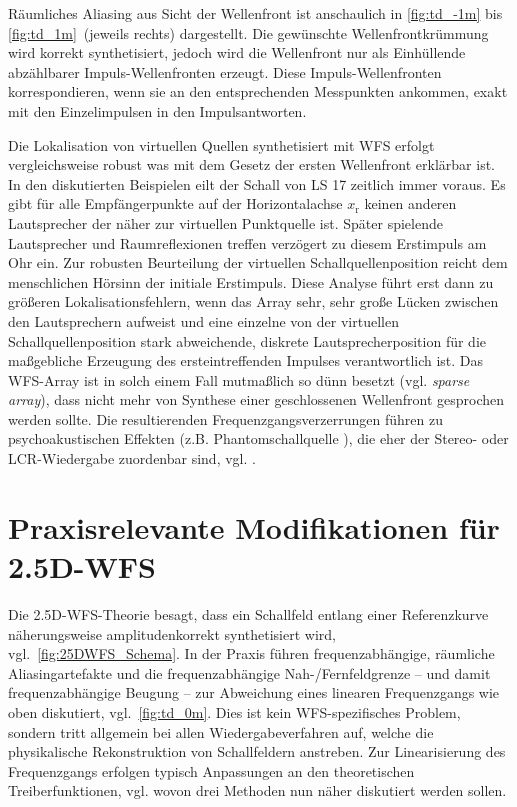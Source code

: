 Räumliches Aliasing aus Sicht der Wellenfront ist anschaulich
in \Abb\ref{fig:td_-1m} bis \ref{fig:td_1m}~(jeweils rechts)
dargestellt.
%
Die gewünschte Wellenfrontkrümmung wird korrekt synthetisiert, jedoch wird die
Wellenfront nur als Einhüllende abzählbarer Impuls-Wellenfronten erzeugt.
%
Diese Impuls-Wellenfronten korrespondieren, wenn sie an den entsprechenden
Messpunkten ankommen, exakt mit den Einzelimpulsen in den Impulsantworten.



Die Lokalisation von virtuellen Quellen synthetisiert mit WFS erfolgt
vergleichsweise robust \cite{Start1997_diss,Wittek2007_diss,Rohr2013_JAES,Wierstorf2014_diss,Erbes2020_diss}
was mit dem Gesetz der ersten Wellenfront \cite{Blauert1997_book} erklärbar ist.
%
In den diskutierten Beispielen eilt der Schall von LS 17 zeitlich immer voraus.
%
Es gibt für alle Empfängerpunkte auf der Horizontalachse $x_\mathrm{r}$
keinen anderen Lautsprecher der näher zur virtuellen Punktquelle ist.
%
Später spielende Lautsprecher und Raumreflexionen treffen
verzögert zu diesem Erstimpuls am Ohr ein.
%
Zur robusten Beurteilung der virtuellen Schallquellenposition reicht dem
menschlichen Hörsinn der initiale Erstimpuls.
%
Diese Analyse führt erst dann zu größeren Lokalisationsfehlern, wenn das Array
sehr, sehr große Lücken zwischen den Lautsprechern aufweist und eine einzelne
von der virtuellen Schallquellenposition stark abweichende, diskrete
Lautsprecherposition für die maßgebliche Erzeugung des ersteintreffenden Impulses
verantwortlich ist.
%
Das WFS-Array ist in solch einem Fall mutmaßlich so dünn besetzt (vgl.
\textit{sparse array}), dass nicht mehr von Synthese einer geschlossenen
Wellenfront gesprochen werden sollte.
%
Die resultierenden Frequenzgangsverzerrungen führen zu
psychoakustischen Effekten
(z.B. Phantomschallquelle \cite{Blauert1997_book}), die
eher der Stereo- oder LCR-Wiedergabe zuordenbar sind,
vgl. \cite{Wittek2007_diss,Wierstorf2014_diss}.



\section{Praxisrelevante Modifikationen für 2.5D-WFS}
\label{sec:mods_25d_wfs}
%
Die 2.5D-WFS-Theorie besagt, dass ein Schallfeld entlang einer
Referenzkurve näherungsweise amplitudenkorrekt synthetisiert wird,
vgl.~\Abb\ref{fig:25DWFS_Schema}.
%
In der Praxis führen frequenzabhängige, räumliche Aliasingartefakte und
die frequenzabhängige Nah-/Fernfeldgrenze -- und damit frequenzabhängige Beugung --
zur Abweichung eines linearen Frequenzgangs wie oben diskutiert,
vgl.~\Abb\ref{fig:td_0m}.
%
Dies ist kein WFS-spezifisches Problem, sondern tritt allgemein bei allen
Wiedergabeverfahren auf, welche die physikalische
Rekonstruktion von Schallfeldern anstreben.
%
Zur Linearisierung des Frequenzgangs erfolgen typisch Anpassungen an den
theoretischen Treiberfunktionen, vgl. \cite{Apel2004,Kolundzija2009b,Spors2010a}
wovon drei Methoden nun näher diskutiert werden sollen.



